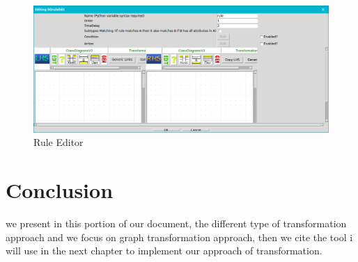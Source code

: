 \begin{figure}[th]
	\centering
 	\includegraphics[scale=0.38]{ch3/img/ruleEditor}
	\caption{\label{fig:Rule Editor}Rule Editor}
\end{figure} 

\section{Conclusion}
we present in this portion of our document, the different type of transformation approach and we focus on graph transformation approach, then we cite the tool i will use in the next chapter to implement our approach of transformation.

 